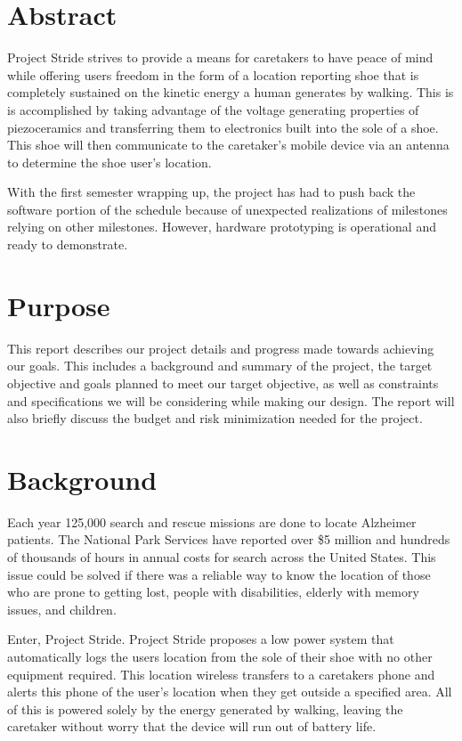 \documentclass[letterpaper, 12 pt, onecolumn, hidelinks]{ieeetran}
\begin{document}
\section*{Abstract}
Project Stride strives to provide a means for caretakers to have peace of mind while offering users freedom in the form of a location reporting shoe that is completely sustained on the kinetic energy a human generates by walking. This is is accomplished by taking advantage of the voltage generating properties of piezoceramics and transferring them to electronics built into the sole of a shoe. This shoe will then communicate to the caretaker's mobile device via an antenna to determine the shoe user's location.

With the first semester wrapping up, the project has had to push back the software portion of the schedule because of unexpected realizations of milestones relying on other milestones. However, hardware prototyping is operational and ready to demonstrate.

\break

\section{Purpose}\label{sec:Purpose}
This report describes our project details and progress made towards achieving our goals. This includes a background and summary of the project, the target objective and goals planned to meet our target objective, as well as constraints and specifications we will be considering while making our design. The report will also briefly discuss the budget and risk minimization needed for the project.

\section{Background}\label{sec:Background}
Each year 125,000 search and rescue missions are done to locate Alzheimer patients. The National Park Services have reported over \$5 million and hundreds of thousands of hours in annual costs for search across the United States. This issue could be solved if there was a reliable way to know the location of those who are prone to getting lost, people with disabilities, elderly with memory issues, and children. 

Enter, Project Stride. Project Stride proposes a low power system that automatically logs the users location from the sole of their shoe with no other equipment required. This location wireless transfers to a caretakers phone and alerts this phone of the user's location when they get outside a specified area. All of this is powered solely by the energy generated by walking, leaving the caretaker without worry that the device will run out of battery life.
\end{document}
